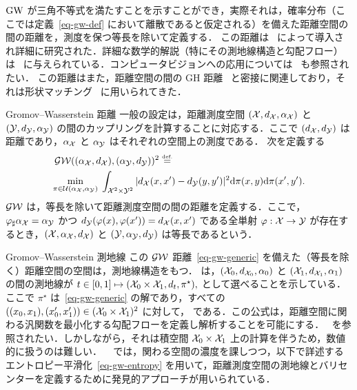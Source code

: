 $\operatorname{\mathrm{GW}}$ が三角不等式を満たすことを示すことができ，実際それは，確率分布（ここでは定義~\eqref{eq-gw-def} において離散であると仮定される）を備えた距離空間の間の距離を，測度を保つ等長を除いて定義する．
%
この距離は~\citet{memoli-2011} によって導入され詳細に研究された．詳細な数学的解説（特にその測地線構造と勾配フロー）は~\citep{SturmGW} に与えられている．コンピュータビジョンへの応用については~\citep{schmitzer2013modelling} も参照されたい．
%
この距離はまた，距離空間の間の GH 距離~\citep{gromov-2001} と密接に関連しており，それは形状マッチング~\citep{memoli-2007,bronstein-2010} に用いられてきた．



\begin{rem2}{Gromov--Wasserstein 距離}
	一般の設定は，距離測度空間 $(\mathcal{X},d_{\mathcal{X}},\alpha_{\mathcal{X}})$ と $(\mathcal{Y},d_{\mathcal{Y}},\alpha_{\mathcal{Y}})$ の間のカップリングを計算することに対応する．ここで $(d_{\mathcal{X}},d_{\mathcal{Y}})$ は距離であり，$\alpha_{\mathcal{X}}$ と $\alpha_{\mathcal{Y}}$ はそれぞれの空間上の測度である．
	次を定義する
	\begin{equation}
		\label{eq-gw-generic}
		\begin{split}
		&\operatorname{\mathcal{GW}}( (\alpha_{\mathcal{X}},d_{\mathcal{X}}), (\alpha_{\mathcal{Y}},d_{\mathcal{Y}}) )^2 \stackrel{\mbox{\upshape\tiny def.}}{=} \\
		&\underset{ \pi \in \mathcal{U}(\alpha_{\mathcal{X}},\alpha_{\mathcal{Y}}) }{\min}\;
		\int_{\mathcal{X}^2 \times \mathcal{Y}^2}
		| d_{\mathcal{X}}(x,x')-d_{\mathcal{Y}}(y,y') |^2
		\mathrm{d}\pi(x,y)\mathrm{d}\pi(x',y').
		\end{split}
	\end{equation}
	$\operatorname{\mathcal{GW}}$ は，等長を除いて距離測度空間の間の距離を定義する．ここで，$\varphi_{\sharp}\alpha_{\mathcal{X}}=\alpha_{\mathcal{Y}}$ かつ $d_{\mathcal{Y}}(\varphi(x),\varphi(x'))=d_{\mathcal{X}}(x,x')$ である全単射 $\varphi : \mathcal{X} \rightarrow \mathcal{Y}$ が存在するとき，$(\mathcal{X},\alpha_{\mathcal{X}},d_{\mathcal{X}})$ と $(\mathcal{Y},\alpha_{\mathcal{Y}},d_{\mathcal{Y}})$ は等長であるという．
\end{rem2}



\begin{rem2}{Gromov--Wasserstein 測地線}\label{rem-geod-gw}
この $\operatorname{\mathcal{GW}}$ 距離~\eqref{eq-gw-generic} を備えた（等長を除く）距離空間の空間は，測地線構造をもつ．\citet{SturmGW} は，$(\mathcal{X}_0,d_{\mathcal{X}_0},\alpha_0)$ と $(\mathcal{X}_1,d_{\mathcal{X}_1},\alpha_1)$ の間の測地線が
$t \in [0,1] \mapsto (\mathcal{X}_0 \times \mathcal{X}_1,d_t,\pi^\star),$ として選べることを示している．ここで $\pi^\star$ は~\eqref{eq-gw-generic} の解であり，すべての $((x_0,x_1), (x_0',x_1')) \in (\mathcal{X}_0 \times \mathcal{X}_1)^2$ に対して，
である．この公式は，距離空間に関わる汎関数を最小化する勾配フローを定義し解析することを可能にする．~\citet{SturmGW} を参照されたい．しかしながら，それは積空間 $\mathcal{X}_0 \times \mathcal{X}_1$ 上の計算を伴うため，数値的に扱うのは難しい．
%
~\citep{peyre2016gromov} では，関わる空間の濃度を課しつつ，以下で詳述するエントロピー平滑化~\eqref{eq-gw-entropy} を用いて，距離測度空間の測地線とバリセンターを定義するために発見的アプローチが用いられている．
\end{rem2}


